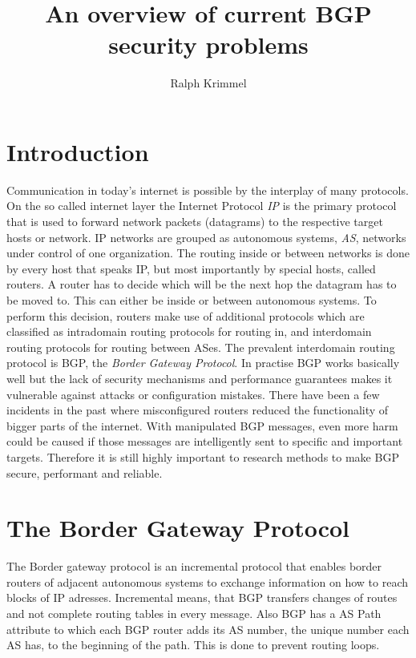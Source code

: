 \documentclass[12pt]{IEEEtran}
\author{Ralph Krimmel}
\title{An overview of current BGP security problems}
\begin{document}
	\maketitle
	\begin{abstract}
	\end{abstract}
	\section{Introduction}
	Communication in today's internet is possible by the interplay of many protocols. On the so called internet layer the Internet Protocol \emph{IP} is the primary protocol that is used to forward network packets (datagrams) to the respective target hosts or network. 
	IP networks are grouped as autonomous systems, \emph{AS}, networks under control of one organization. 
	The routing inside or between networks is done by every host that speaks IP, but most importantly by special hosts, called routers. 
	A router has to decide which will be the next hop the datagram has to be moved to. 
	This can either be inside or between autonomous systems. 
	To perform this decision, routers make use of additional protocols which are classified as intradomain routing protocols for routing in, and interdomain routing protocols for routing between ASes. 
	The prevalent interdomain routing protocol is BGP, the \emph{Border Gateway Protocol}. 
	In practise BGP works basically well but the lack of security mechanisms and performance guarantees makes it vulnerable against attacks or configuration mistakes. 
	There have been a few incidents in the past where misconfigured routers reduced the functionality of bigger parts of the internet. 
	With manipulated BGP messages, even more harm could be caused if those messages are intelligently sent to specific and important targets. 
	Therefore it is still highly important to research methods to make BGP secure, performant and reliable. 
	\section{The Border Gateway Protocol}
	The Border gateway protocol is an incremental protocol that enables border routers of adjacent autonomous systems to exchange information on how to reach blocks of IP adresses. 
	Incremental means, that BGP transfers changes of routes and not complete routing tables in every message. Also BGP has a AS Path attribute to which 
	each BGP router adds its AS number, the unique number each AS has, to the beginning of the path. This is done to prevent routing loops.
	
\end{document}
